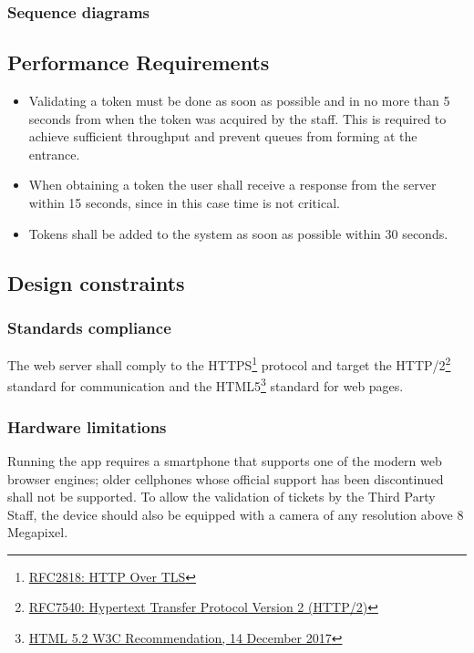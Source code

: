 \subsubsection{Sequence diagrams}

\subsection{Performance Requirements}
\begin{itemize}
    \item Validating a token must be done as soon as possible and in no more than 5 seconds from when the token was acquired by the staff. This is required to achieve sufficient throughput and prevent queues from forming at the entrance.
    \item When obtaining a token the user shall receive a response from the server within 15 seconds, since in this case time is not critical.
    \item Tokens shall be added to the system as soon as possible within 30 seconds.
\end{itemize}
\subsection{Design constraints}
\subsubsection{Standards compliance}
The web server shall comply to the HTTPS\footnote{\href{https://tools.ietf.org/html/rfc2818}{RFC2818: HTTP Over TLS}} protocol and target the HTTP/2\footnote{\href{https://tools.ietf.org/html/rfc7540}{RFC7540: Hypertext Transfer Protocol Version 2 (HTTP/2)}} standard for communication and the HTML5\footnote{\href{https://www.w3.org/TR/2017/REC-html52-20171214/}{HTML 5.2 W3C Recommendation, 14 December 2017}} standard for web pages.

\subsubsection{Hardware limitations}
Running the app requires a smartphone that supports one of the modern web browser engines; older cellphones whose official support has been discontinued shall not be supported.
To allow the validation of tickets by the Third Party Staff, the device should also be equipped with a camera of any resolution above 8 Megapixel.

